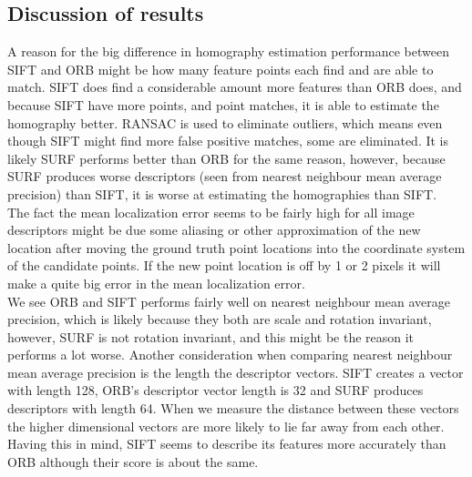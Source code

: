 \subsection{Discussion of results}
A reason for the big difference in homography estimation performance between SIFT and ORB might be how many feature points each find and are able to match. SIFT does find a considerable amount more features than ORB does, and because SIFT have more points, and point matches, it is able to estimate the homography better. RANSAC is used to eliminate outliers, which means even though SIFT might find more false positive matches, some are eliminated. It is likely SURF performs better than ORB for the same reason, however, because SURF produces worse descriptors (seen from nearest neighbour mean average precision) than SIFT, it is worse at estimating the homographies than SIFT.\\
The fact the mean localization error seems to be fairly high for all image descriptors might be due some aliasing or other approximation of the new location after moving the ground truth point locations into the coordinate system of the candidate points. If the new point location is off by 1 or 2 pixels it will make a quite big error in the mean localization error.\\
We see ORB and SIFT performs fairly well on nearest neighbour mean average precision, which is likely because they both are scale and rotation invariant, however, SURF is not rotation invariant, and this might be the reason it performs a lot worse. Another consideration when comparing nearest neighbour mean average precision is the length the descriptor vectors. SIFT creates a vector with length 128, ORB's descriptor vector length is 32 and SURF produces descriptors with length 64. When we measure the distance between these vectors the higher dimensional vectors are more likely to lie far away from each other. Having this in mind, SIFT seems to describe its features more accurately than ORB although their score is about the same.
